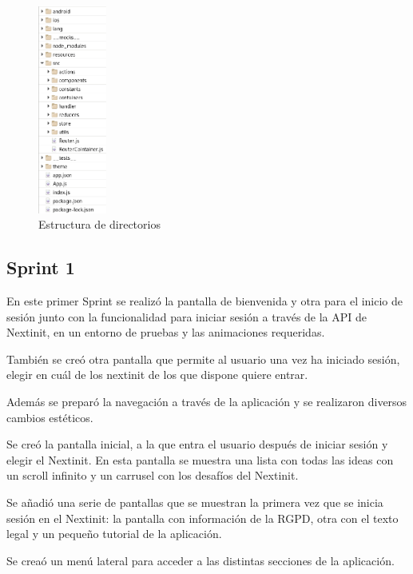 \begin{figure}[!h]
	\begin{center}
		\includegraphics[width=0.2\textwidth]{./img/resultados/estructura.png}
		\caption{Estructura de directorios}
		\label{fig:estructura}
	\end{center}
\end{figure}

\subsection{Sprint 1}

En este primer Sprint se realizó la pantalla de bienvenida y otra para el inicio de sesión junto 
con la funcionalidad para iniciar sesión a través de la API de Nextinit, en un entorno de 
pruebas y las animaciones requeridas.

También se creó otra pantalla que permite al usuario una vez ha iniciado sesión,
elegir en cuál de los nextinit de los que dispone quiere entrar.

Además se preparó la navegación a través de la aplicación y se realizaron diversos 
cambios estéticos.

Se creó la pantalla inicial, a la que entra el usuario después de iniciar sesión y elegir el 
Nextinit. En esta pantalla se muestra una lista con todas las ideas con un scroll infinito
y un carrusel con los desafíos del Nextinit.

Se añadió una serie de pantallas que se muestran la primera vez que se inicia sesión 
en el Nextinit: la pantalla con información de la RGPD, otra con el texto legal y 
un pequeño tutorial de la aplicación.

Se creaó un menú lateral para acceder a las distintas secciones de la 
aplicación.

